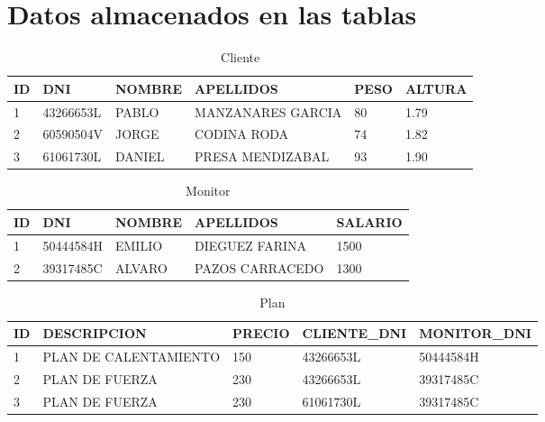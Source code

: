 \documentclass[12pt, a4paper]{article}
\begin{document}
	\section{Datos almacenados en las tablas}
	\begin{table}[H]
		\caption{Cliente}
		\centering
		\begin{tabular}{@{} m{0.5cm} m{2.2cm} m{2.4cm} m{5cm} m{1.4cm} m{2cm} @{}}
			\toprule
			\textbf{ID} & \textbf{DNI} & \textbf{NOMBRE} & \textbf{APELLIDOS} & \textbf{PESO} & \textbf{ALTURA} \\ \midrule
			1           & 43266653L    & PABLO           & MANZANARES GARCIA  & 80            & 1.79            \\
			2           & 60590504V    & JORGE           & CODINA RODA        & 74            & 1.82            \\
			3           & 61061730L    & DANIEL          & PRESA MENDIZABAL   & 93            & 1.90            \\ \bottomrule
		\end{tabular}
		\par
	\end{table}
	\begin{table}[H]
		\centering
		\caption{Monitor}
		\begin{tabular}{@{} m{0.5cm} m{2.2cm} m{2.4cm} m{5cm} m{4cm} @{}}
			\toprule
			\textbf{ID} & \textbf{DNI} & \textbf{NOMBRE} & \textbf{APELLIDOS} & \textbf{SALARIO} \\ \midrule
			1           & 50444584H    & EMILIO          & DIEGUEZ FARINA     & 1500             \\
			2           & 39317485C    & ALVARO          & PAZOS CARRACEDO    & 1300            \\ \bottomrule
		\end{tabular}
	\end{table}
	\begin{table}[H]
		\centering
		\caption{Plan}
		\begin{tabular}{@{} m{0.5cm} m{4.5cm} m{2cm} m{3.5cm} m{3.5cm} @{}}
			\toprule
			\textbf{ID} & \textbf{DESCRIPCION}  & \textbf{PRECIO} & \textbf{CLIENTE\_DNI} & \textbf{MONITOR\_DNI} \\ \midrule
			1           & PLAN DE CALENTAMIENTO & 150             & 43266653L             & 50444584H             \\
			2           & PLAN DE FUERZA        & 230             & 43266653L             & 39317485C             \\
			3           & PLAN DE FUERZA        & 230             & 61061730L             & 39317485C             \\ \bottomrule
		\end{tabular}
	\end{table}	
\end{document}
